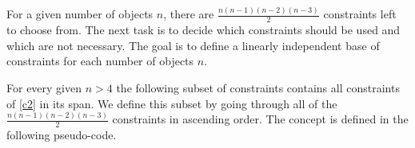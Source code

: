 For a given number of objects $n$, there are $\frac{n(n-1)(n-2)(n-3)}{2}$ constraints left to choose from. The next task is to decide which constraints should be used and which are not necessary. The goal is to define a linearly independent base of constraints for each number of objects $n$.

\newpage
\begin{theorem} \label{construction}
	For every given $n>4$ the following subset of constraints contains all constraints of \ref{c2} in its span. We define this subset by going through all of the $\frac{n(n-1)(n-2)(n-3)}{2}$ constraints in ascending order. The concept is defined in the following pseudo-code.
	


%


\end{theorem}
